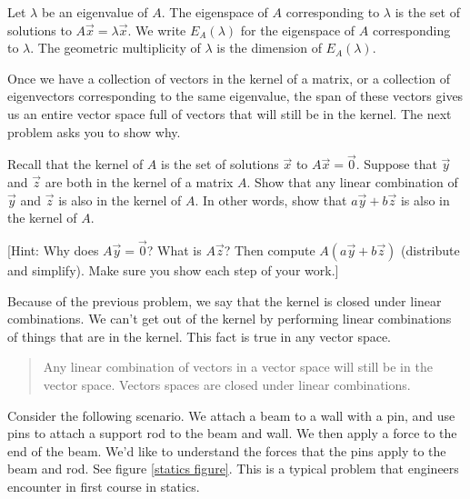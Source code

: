\begin{definition}[Eigenspace]
 Let $\lambda$ be an eigenvalue of $A$.  The eigenspace of $A$ corresponding to $\lambda$ is the set of solutions to $A\vec x = \lambda \vec x$.  We write $E_A(\lambda)$ for the eigenspace of $A$ corresponding to $\lambda$. The geometric multiplicity of $\lambda$ is the dimension of $E_A(\lambda)$.  
\end{definition}


 
Once we have a collection of vectors in the kernel of a matrix, or a collection of eigenvectors corresponding to the same eigenvalue, the span of these vectors gives us an entire vector space full of vectors that will still be in the kernel. The next problem asks you to show why.

\begin{problem}
Recall that the kernel of $A$ is the set of solutions $\vec x$ to $A\vec x = \vec 0$.  
 Suppose that $\vec y$ and $\vec z$ are both in the kernel of a matrix $A$. Show that any linear combination of $\vec y$ and $\vec z$ is also in the kernel of $A$. In other words, show that $a\vec y+b\vec z$ is also in the kernel of $A$. 

[Hint: Why does $A\vec y=\vec 0$? What is $A\vec z$? Then compute $A(a\vec y+b\vec z)$ (distribute and simplify). Make sure you show each step of your work.]  
\end{problem}

Because of the previous problem, we say that the kernel is closed under linear combinations. We can't get out of the kernel by performing linear combinations of things that are in the kernel. This fact is true in any vector space. \begin{quote}
Any linear combination of vectors in a vector space will still be in the vector space. Vectors spaces are closed under linear combinations.   
\end{quote}




 











\mysubsection{\ideacon}

Consider the following scenario.  We attach a beam to a wall with a pin, and use pins to attach a support rod to the beam and wall.  We then apply a force to the end of the beam.  We'd like to understand the forces that the pins apply to the beam and rod. See figure \ref{statics figure}. This is a typical problem that engineers encounter in first course in statics.
  

